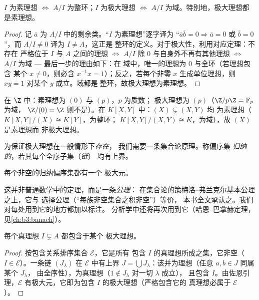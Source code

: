 \begin{proposition}\label{prop:b3:rings:primemaximal}
$I$ 为素理想 $\iff$ $A/I$ 为整环；$I$ 为极大理想
$\iff$ $A/I$ 为域。特别地，极大理想都是素理想。
\end{proposition}

\begin{proof}
记 $\bar a$ 为 $A/I$ 中的剩余类。“$I$ 为素理想”逐字译为
“$\bar a\bar b = 0 \Rightarrow \bar a = 0$ 或 $\bar b
= 0$”，而 $A/I \neq 0$ 译为 $I \neq A$，这正是
整环的定义。对于极大性，利用对应定理：不存在
严格位于 $I$ 与 $A$ 之间的理想 $\iff$ $A/I$ 除
$0$ 与自身外不再有其他理想 $\iff$ $A/I$ 为域 --- 最后一步的理由如下：在
域中，唯一的理想为 $0$ 与全环（若理想包含
某个 $x \ne 0$，则必含 $x^{-1}x = 1$）；反之，若每个非零 $x$
生成单位理想，则 $xy = 1$ 对某个 $y$ 成立。域都是
整环，故极大理想为素理想。
\end{proof}

\begin{example}\label{ex:b3:rings:primemaximal}
在 $\Z$ 中：素理想为 $(0)$ 与 $(p)$，$p$ 为质数；
极大理想为 $(p)$（$\Z/p\Z = \mathbb F_p$ 为域，
$\Z/(0) = \Z$ 则不是）。在 $K[X, Y]$ 中：$(X) \subsetneq (X, Y)$ 均
为素理想（$K[X,Y]/(X) \cong K[Y]$，为整环；
$K[X,Y]/(X,Y) \cong K$，为域），故 $(X)$ 是素理想而
非极大理想。
\end{example}

为保证极大理想在一般情形下\emph{存在}，
我们需要一条集合论原理。称偏序集
\emph{归纳的}，若其每个全序子集（\emph{链}）
均有上界。

\begin{theorem}[佐恩引理]\label{thm:b3:rings:zorn}
每个非空的归纳偏序集都有一个
极大元。
\admitted
\end{theorem}

\begin{remark}\label{rem:b3:rings:zorn}
这并非普通数学中的定理，而是一条\emph{公理}：
在集合论的策梅洛–弗兰克尔基本公理之上，它与
选择公理（“每族非空集合之积非空”）等价，
本书全文承认之。我们对每处用到它的地方都加以标注。
分析学中还将再次用到它（哈恩–巴拿赫定理，
见\cref{ch:b3:banach}）。
\end{remark}

\begin{theorem}[克鲁尔定理]\label{thm:b3:rings:krull}
每个真理想 $I \subsetneq A$ 都包含于某个
极大理想。
\end{theorem}

\begin{proof}
按包含关系排序集合 $\mathcal E$，它是所有
包含 $I$ 的真理想所成之集，它非空（$I \in \mathcal E$）。一条链
$(J_\lambda)$ 在 $\mathcal E$ 中有上界 $J = \bigcup
J_\lambda$：该并为理想（任意 $a, b \in J$ 同属某个 $J_\lambda$，
由全序性），为真理想（$1 \notin J_\lambda$ 对一切 $\lambda$ 成立），
且包含 $I$。由佐恩引理，$\mathcal
E$ 有极大元，它即为包含 $I$ 的极大理想（严格包含它的
真理想必属于 $\mathcal E$）。
\end{proof}

